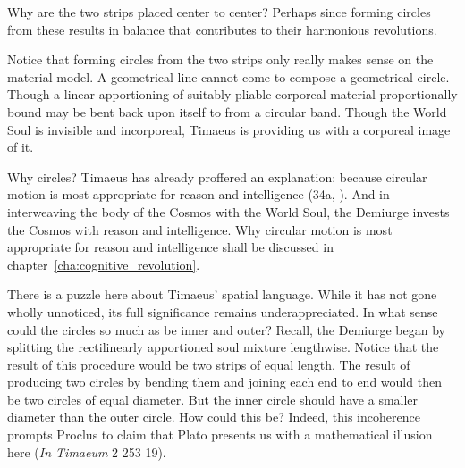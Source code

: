 Why are the two strips placed center to center? Perhaps since forming circles from these results in balance that contributes to their harmonious revolutions.

Notice that forming circles from the two strips only really makes sense on the material model. A geometrical line cannot come to compose a geometrical circle. Though a linear apportioning of suitably pliable corporeal material proportionally bound may be bent back upon itself to from a circular band. Though the World Soul is invisible and incorporeal, Timaeus is providing us with a corporeal image of it.

Why circles? Timaeus has already proffered an explanation: because circular motion is most appropriate for reason and intelligence (34a, \citealt[31]{Vlastos:1975aa}). And in interweaving the body of the Cosmos with the World Soul, the Demiurge invests the Cosmos with reason and intelligence. Why circular motion is most appropriate for reason and intelligence shall be discussed in chapter~\ref{cha:cognitive_revolution}.

There is a puzzle here about Timaeus' spatial language. While it has not gone wholly unnoticed, its full significance remains underappreciated. In what sense could the circles so much as be inner and outer? Recall, the Demiurge began by splitting the rectilinearly apportioned soul mixture lengthwise. Notice that the result of this procedure would be two strips of equal length. The result of producing two circles by bending them and joining each end to end would then be two circles of equal diameter. But the inner circle should have a smaller diameter than the outer circle. How could this be? Indeed, this incoherence prompts Proclus to claim that Plato presents us with a mathematical illusion here (\emph{In Timaeum} 2 253 19).

